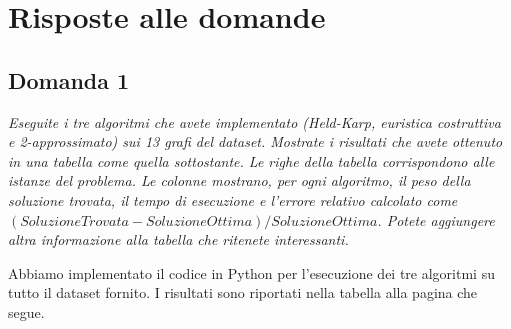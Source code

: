 \section{Risposte alle domande}

\subsection{Domanda 1}

\textit{Eseguite i tre algoritmi che avete implementato (Held-Karp, euristica costruttiva e 2-approssimato) sui 13 grafi
del dataset. Mostrate i risultati che avete ottenuto in una tabella come quella sottostante. Le righe della tabella
corrispondono alle istanze del problema. Le colonne mostrano, per ogni algoritmo, il peso della soluzione trovata, il
tempo di esecuzione e l'errore relativo calcolato come $(SoluzioneTrovata - SoluzioneOttima) / SoluzioneOttima$. Potete
aggiungere altra informazione alla tabella che ritenete interessanti.}

Abbiamo implementato il codice in Python per l'esecuzione dei tre algoritmi su tutto il dataset fornito. I risultati sono riportati nella tabella alla pagina che segue.


